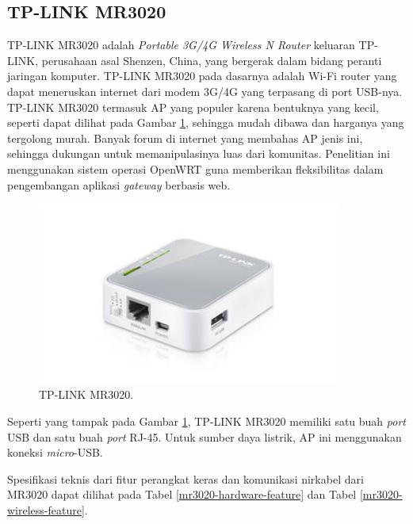   \subsection{TP-LINK MR3020}
    TP-LINK MR3020 adalah \emph{Portable 3G/4G Wireless N Router} keluaran TP-LINK, perusahaan asal Shenzen, China, yang bergerak dalam bidang peranti jaringan komputer. TP-LINK MR3020 pada dasarnya adalah Wi-Fi router yang dapat meneruskan internet dari modem 3G/4G yang terpasang di port USB-nya. TP-LINK MR3020 termasuk AP yang populer karena bentuknya yang kecil, seperti dapat dilihat pada Gambar \ref{mr3020}, sehingga mudah dibawa dan harganya yang tergolong murah. Banyak forum di internet yang membahas AP jenis ini, sehingga dukungan untuk memanipulasinya luas dari komunitas. Penelitian ini menggunakan sistem operasi OpenWRT guna memberikan fleksibilitas dalam pengembangan aplikasi \emph{gateway} berbasis web.

    \begin{figure}[H]
      \centering
        \includegraphics[width=10cm]{gambar/mr3020}
        \caption{TP-LINK MR3020.}
        \label{mr3020}
    \end{figure}

    Seperti yang tampak pada Gambar \ref{mr3020}, TP-LINK MR3020 memiliki satu buah \emph{port} USB dan satu buah \emph{port} RJ-45. Untuk sumber daya listrik, AP ini menggunakan koneksi \emph{micro}-USB.

    Spesifikasi teknis dari fitur perangkat keras dan komunikasi nirkabel dari MR3020 dapat dilihat pada Tabel \ref{mr3020-hardware-feature} dan Tabel \ref{mr3020-wireless-feature}.

